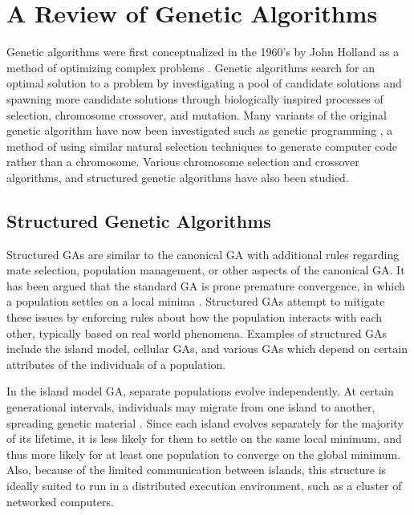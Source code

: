 
  \section{A Review of Genetic Algorithms} %
    Genetic algorithms were first conceptualized in the 1960’s by John Holland as a
      method of optimizing complex problems \cite{Goldberg1988}. 
    Genetic algorithms search for an optimal solution to a problem by
      investigating a pool of candidate solutions and spawning more candidate
      solutions through biologically inspired processes of selection,
      chromosome crossover, and mutation. 
    Many variants of the original genetic algorithm have now been investigated
      such as genetic programming \cite{Koza1994, Banzhaf2000}, a method of using
      similar natural selection techniques to generate computer code rather than
      a chromosome. 
    Various chromosome selection and crossover algorithms, and structured
      genetic algorithms have also been studied. 

  \subsection{Structured Genetic Algorithms} %
    Structured GAs are similar to the canonical GA with additional rules regarding
      mate selection, population management, or other aspects of the canonical GA. 
    It has been argued that the standard GA is prone premature convergence, in
    which a population settles on a local minima \cite{Fogel1994}. 
    Structured GAs attempt to mitigate these issues by enforcing rules about
      how the population interacts with each other, typically based on real world
      phenomena. 
    Examples of structured GAs include the island model, cellular GAs, and
      various GAs which depend on certain attributes of the individuals of a
      population.

    In the island model GA, separate populations evolve independently. 
    At certain generational intervals, individuals may migrate from one island
      to another, spreading genetic material \cite{Whitley1999, Artyushenko2009}.
    Since each island evolves separately for the majority of its lifetime, it
      is less likely for them to settle on the same local minimum, and thus more
      likely for at least one population to converge on the global minimum. 
    Also, because of the limited communication between islands, this structure
      is ideally suited to run in a distributed execution environment, such as a
      cluster of networked computers.

